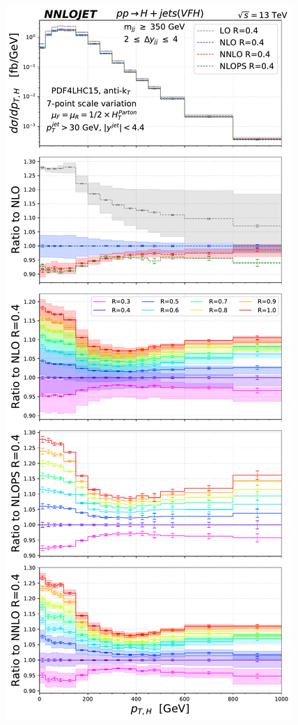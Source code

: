 \documentclass[10pt,prd,fleqn,superscriptaddress,notitlepage,nofootinbib,preprintnumbers,nobalancelastpage]{revtex4-1}
\begin{document}
\begin{figure}[t]
\includegraphics[scale=0.3]{figures/rdep/LH19VFH_pth_largebin_heavy_middle.pdf}\hfill

\end{figure}
\end{document}
